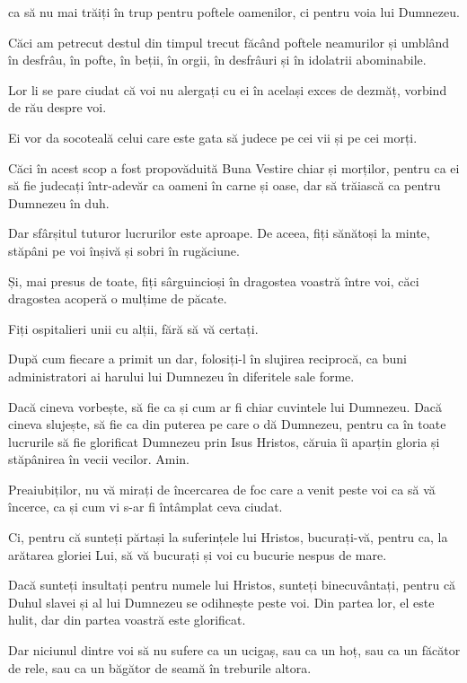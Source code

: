 {ca să nu mai trăiți în trup pentru poftele oamenilor, ci pentru voia lui Dumnezeu.

Căci am petrecut destul din timpul trecut făcând poftele neamurilor și umblând în desfrâu, în pofte, în beții, în orgii, în desfrâuri și în idolatrii abominabile.

Lor li se pare ciudat că voi nu alergați cu ei în același exces de dezmăț, vorbind de rău despre voi.

Ei vor da socoteală celui care este gata să judece pe cei vii și pe cei morți.

Căci în acest scop a fost propovăduită Buna Vestire chiar și morților, pentru ca ei să fie judecați într-adevăr ca oameni în carne și oase, dar să trăiască ca pentru Dumnezeu în duh.


\par }{\PP {}Dar sfârșitul tuturor lucrurilor este aproape. De aceea, fiți sănătoși la minte, stăpâni pe voi înșivă și sobri în rugăciune.

Și, mai presus de toate, fiți sârguincioși în dragostea voastră între voi, căci dragostea acoperă o mulțime de păcate.

Fiți ospitalieri unii cu alții, fără să vă certați.

După cum fiecare a primit un dar, folosiți-l în slujirea reciprocă, ca buni administratori ai harului lui Dumnezeu în diferitele sale forme.

Dacă cineva vorbește, să fie ca și cum ar fi chiar cuvintele lui Dumnezeu. Dacă cineva slujește, să fie ca din puterea pe care o dă Dumnezeu, pentru ca în toate lucrurile să fie glorificat Dumnezeu prin Isus Hristos, căruia îi aparțin gloria și stăpânirea în vecii vecilor. Amin.


\par }{\PP {}Preaiubiților, nu vă mirați de încercarea de foc care a venit peste voi ca să vă încerce, ca și cum vi s-ar fi întâmplat ceva ciudat.

Ci, pentru că sunteți părtași la suferințele lui Hristos, bucurați-vă, pentru ca, la arătarea gloriei Lui, să vă bucurați și voi cu bucurie nespus de mare.

Dacă sunteți insultați pentru numele lui Hristos, sunteți binecuvântați, pentru că Duhul slavei și al lui Dumnezeu se odihnește peste voi. Din partea lor, el este hulit, dar din partea voastră este glorificat.

Dar niciunul dintre voi să nu sufere ca un ucigaș, sau ca un hoț, sau ca un făcător de rele, sau ca un băgător de seamă în treburile altora.

}

